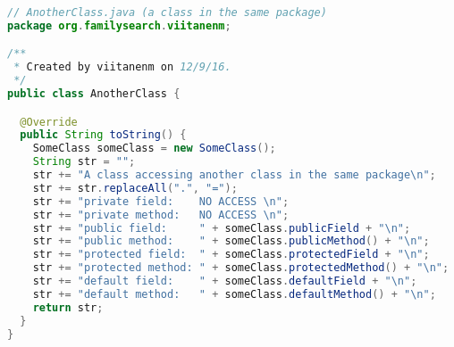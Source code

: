 \begin{lstlisting}[language=Java]
// AnotherClass.java (a class in the same package)
package org.familysearch.viitanenm;

/**
 * Created by viitanenm on 12/9/16.
 */
public class AnotherClass {

  @Override
  public String toString() {
    SomeClass someClass = new SomeClass();
    String str = "";
    str += "A class accessing another class in the same package\n";
    str += str.replaceAll(".", "=");
    str += "private field:    NO ACCESS \n";
    str += "private method:   NO ACCESS \n";
    str += "public field:     " + someClass.publicField + "\n";
    str += "public method:    " + someClass.publicMethod() + "\n";
    str += "protected field:  " + someClass.protectedField + "\n";
    str += "protected method: " + someClass.protectedMethod() + "\n";
    str += "default field:    " + someClass.defaultField + "\n";
    str += "default method:   " + someClass.defaultMethod() + "\n";
    return str;
  }
}
\end{lstlisting}

